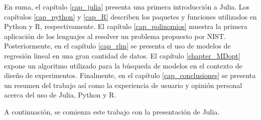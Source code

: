 En suma, el capítulo \ref{cap_julia} presenta una primera introducción a \textsf{Julia}. Los capítulos \ref{cap_python} y \ref{cap_R} describen los paquetes y funciones utilizados en \textsf{Python} y \textsf{R}, respectivamente. El capítulo \ref{cap_polinomios} muestra la primera aplicación de los lenguajes al resolver un problema propuesto por NIST. Posteriormente, en el capítulo \ref{cap_rlm} se presenta el uso de modelos de regresión lineal en una gran cantidad de datos. El capítulo \ref{chapter_MDopt} expone un algoritmo utilizado para la búsqueda de modelos en el contexto de diseño de experimentos. Finalmente, en el capítulo \ref{cap_conclusiones} se presenta un resumen del trabajo así como la experiencia de usuario y opinión personal acerca del uso de \textsf{Julia, Python} y \textsf{R}. 

A continuación, se comienza este trabajo con la presentación de \textsf{Julia}. 



